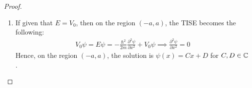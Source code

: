 \documentclass{article}
\begin{document}
\begin{proof}
\begin{enumerate}
\begin{align}
            Ce^{wa}+De^{-wa}=Fe^{ika}=-\frac{iw}{k}Ce^{wa}+\frac{iw}{k}De^{-wa}\implies \left(1+\frac{iw}{k}\right)Ce^{wa}+\left(1-\frac{iw}{k}\right)De^{-wa}=0
        \end{align}
        Plugin the previous equalities about $Ce^{wa}, De^{-wa}$ (with some simplification), we get:
        \begin{align}
            0=&\left(1+\frac{iw}{k}\right)\frac{e^{2wa}}{2}\left(\left(1+\frac{ik}{w}\right)Ae^{-ika}\left(1-\frac{ik}{w}\right)Be^{ika}\right)\\
            &+\left(1-\frac{iw}{k}\right)\frac{e^{-2wa}}{2}\left(\left(1-\frac{ik}{w}\right)Ae^{-ka}+\left(1+\frac{ik}{w}\right)Be^{ika}\right)\\
            &\implies A\left(\frac{w^2+k^2}{kw}\right)ie^{-ika}\sinh(2wa) = -Be^{ika}\left(2\cosh(2wa)+i\frac{w^2-k^2}{kw}\sinh(2wa)\right)\\
            &\implies |A|^2\left(\frac{w^2+k^2}{wk}\right)^2\sinh^2(2wa) = |B|^2\left(4+\left(\frac{w^2+k^2}{wk}\right)^2\sinh^2(2wa)\right)\\
            &\implies \frac{|B|^2}{|A|^2} = \frac{\left(\frac{w^2+k^2}{wk}\right)^2\sinh^2(2wa)}{4+\left(\frac{w^2+k^2}{wk}\right)^2\sinh^2(2wa)}
        \end{align}
        Which, the transmission rate $T=1-\frac{|B|^2}{|A|^2}$ can be given as below:
        \begin{align}
            &T=1-\frac{|B|^2}{|A|^2} = \frac{4}{4+\left(\frac{w^2+k^2}{wk}\right)^2\sinh^2(2wa)}\\
            &\implies T^{-1} = 1+\frac{1}{4}\left(\frac{w^2+k^2}{wk}\right)^2\sinh^2(2wa)
        \end{align}
        Finally, recall that $w=\frac{\sqrt{2m(V_0-E)}}{\hbar}$ and $k=\frac{\sqrt{2mE}}{\hbar}$, so $w^2+k^2 = \frac{2m(V_0-E)}{\hbar^2}+\frac{2mE}{\hbar^2}=\frac{2mV_0}{\hbar^2}$, while $kw = \frac{2m\sqrt{E(V_0-E)}}{\hbar^2}$. This shows that $\left(\frac{w^2+k^2}{wk}\right)^2=\frac{V_0^2}{E(V_0-E)}$. Hence, $T^{-1}$ expands to be the following:
        \begin{align}
            T^{-1} = 1+\frac{1}{4}\cdot\frac{V_0^2}{E(V_0-E)}\sinh^2\left(2a\cdot\frac{\sqrt{2m(V_0-E)}}{\hbar}\right) = 1+\frac{V_0^2}{4E(V_0-E)}\sinh^2\left(\frac{2a}{\hbar}\sqrt{2m(V_0-E)}\right)
        \end{align}
        
        \hfil

        \item If given that $E=V_0$, then on the region $(-a,a)$, the TISE becomes the following:
        \begin{align}
            V_0\psi = E\psi=-\frac{\hbar^2}{2m}\frac{\partial^2\psi}{\partial x^2}+V_0\psi \implies \frac{\partial^2\psi}{\partial x^2}=0
        \end{align}
        Hence, on the region $(-a,a)$, the solution is $\psi(x)=Cx+D$ for $C,D\in\mathbb{C}$.


\end{enumerate}
\end{proof}
\end{document}
